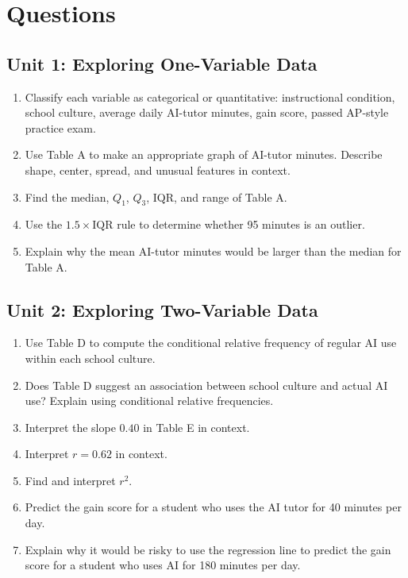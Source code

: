 \documentclass[11pt]{article}
\begin{document}
\section{Questions}

\subsection*{Unit 1: Exploring One-Variable Data}
\begin{enumerate}[leftmargin=*]
\item Classify each variable as categorical or quantitative:
instructional condition, school culture, average daily AI-tutor
minutes, gain score, passed AP-style practice exam.
\item Use Table A to make an appropriate graph of AI-tutor minutes.
Describe shape, center, spread, and unusual features in context.
\item Find the median, $Q_1$, $Q_3$, IQR, and range of Table A.
\item Use the $1.5 \times \text{IQR}$ rule to determine whether 95
minutes is an outlier.
\item Explain why the mean AI-tutor minutes would be larger than the
median for Table A.
\end{enumerate}

\subsection*{Unit 2: Exploring Two-Variable Data}
\begin{enumerate}[resume,leftmargin=*]
\item Use Table D to compute the conditional relative frequency of
regular AI use within each school culture.
\item Does Table D suggest an association between school culture and
actual AI use? Explain using conditional relative frequencies.
\item Interpret the slope $0.40$ in Table E in context.
\item Interpret $r = 0.62$ in context.
\item Find and interpret $r^2$.
\item Predict the gain score for a student who uses the AI tutor for
40 minutes per day.
\item Explain why it would be risky to use the regression line to
predict the gain score for a student who uses AI for 180 minutes
per day.
\end{enumerate}
\end{document}
